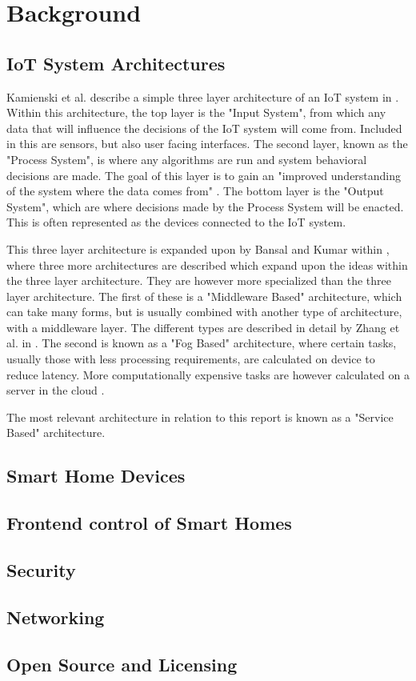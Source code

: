 \chapter{Background} \label{cha:chapter2}

\section{IoT System Architectures} \label{sec:chap2:servers}
Kamienski et al. describe a simple three layer architecture of an IoT system in
\cite{DesigningOpenIotSystem}. Within this architecture, the top layer is the 
"Input System", from which any data that will influence the decisions of the 
IoT system will come from. Included in this are sensors, but also user facing 
interfaces. The second layer, known as the "Process System", is where any 
algorithms are run and system behavioral decisions are made. The goal of this 
layer is to gain an "improved understanding of the system where the  data comes 
from" \cite{DesigningOpenIotSystem}. The bottom layer is the "Output System", 
which are where decisions made by the Process System will be enacted. This is 
often represented as the devices connected to the IoT system.

This three layer architecture is expanded upon by Bansal and Kumar within 
\cite{IotEcosystemSurvey}, where three more architectures are described which 
expand upon the ideas within the three layer architecture. They are however more 
specialized than the three layer architecture. The first of these is a 
"Middleware Based" architecture, which can take many forms, but is usually 
combined with another type of architecture, with a middleware layer. The 
different types are described in detail by Zhang et al. in 
\cite{MiddlewareIOTSurvey}. The second is known as a "Fog Based" architecture, 
where certain tasks, usually those with less processing requirements, are 
calculated on device to reduce latency. More computationally expensive tasks are 
however calculated on a server in the cloud \cite{IoTArchitectures}.

The most relevant architecture in relation to this report is known as a "Service 
Based" architecture.


\section{Smart Home Devices} \label{sec:chap2:devices}
\section{Frontend control of Smart Homes} \label{sec:chap2:frontend}
\section{Security} \label{sec:chap2:security}
\section{Networking} \label{sec:chap2:networking}
\section{Open Source and Licensing} \label{sec:chap2:opensource}

